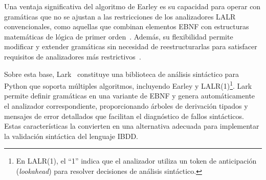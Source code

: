 Una ventaja significativa del algoritmo de Earley es su capacidad para operar con gramáticas que no se ajustan a las restricciones de los analizadores LALR convencionales, como aquellas que combinan elementos EBNF con estructuras matemáticas de lógica de primer orden~\cite{earley1970parsing, grune2008parsing}. Además, su flexibilidad permite modificar y extender gramáticas sin necesidad de reestructurarlas para satisfacer requisitos de analizadores más restrictivos~\cite{grune2008parsing}.

Sobre esta base, Lark~\cite{lark_github} constituye una biblioteca de análisis sintáctico para Python que soporta múltiples algoritmos, incluyendo Earley y LALR(1)\footnote{En LALR(1), el ``1'' indica que el analizador utiliza un token de anticipación (\textit{lookahead}) para resolver decisiones de análisis sintáctico.}. Lark permite definir gramáticas en una variante de EBNF y genera automáticamente el analizador correspondiente, proporcionando árboles de derivación tipados y mensajes de error detallados que facilitan el diagnóstico de fallos sintácticos. Estas características la convierten en una alternativa adecuada para implementar la validación sintáctica del lenguaje IBDD.
